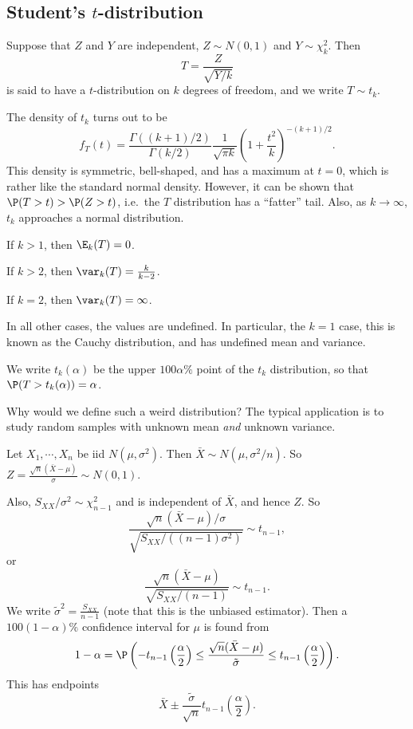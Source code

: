 \documentclass[a4paper]{article}
\begin{document}
\subsection{Student's \texorpdfstring{$t$}{t}-distribution}
\begin{defi}[$t$-distribution]
  Suppose that $Z$ and $Y$ are independent, $Z\sim N(0, 1)$ and $Y\sim \chi_k^2$. Then
  \[
    T = \frac{Z}{\sqrt{Y/k}}
  \]
  is said to have a $t$-distribution on $k$ degrees of freedom, and we write $T\sim t_k$.
\end{defi}

The density of $t_k$ turns out to be
\[
  f_T(t) = \frac{\Gamma((k + 1)/2)}{\Gamma(k/2)} \frac{1}{\sqrt{\pi k}}\left(1 + \frac{t^2}{k}\right)^{-(k+1)/2}.
\]
This density is symmetric, bell-shaped, and has a maximum at $t = 0$, which is rather like the standard normal density. However, it can be shown that $\P(T > t) > \P(Z > t)$, i.e.\ the $T$ distribution has a ``fatter'' tail. Also, as $k \to \infty$, $t_k$ approaches a normal distribution.

\begin{prop}
  If $k > 1$, then $\E_k(T) = 0$.

  If $k > 2$, then $\var_k(T) = \frac{k}{k - 2}$.

  If $k = 2$, then $\var_k(T) = \infty$.

  In all other cases, the values are undefined. In particular, the $k = 1$ case, this is known as the Cauchy distribution, and has undefined mean and variance.
\end{prop}

\begin{notation}
  We write $t_k(\alpha)$ be the upper $100\alpha\%$ point of the $t_k$ distribution, so that $\P(T > t_k(\alpha)) = \alpha$.
\end{notation}

Why would we define such a weird distribution? The typical application is to study random samples with unknown mean \emph{and} unknown variance.

Let $X_1, \cdots, X_n$ be iid $N(\mu, \sigma^2)$. Then $\bar X \sim N(\mu, \sigma^2/n)$. So $Z = \frac{\sqrt{n}(\bar X - \mu)}{\sigma} \sim N(0, 1)$.

Also, $S_{XX}/\sigma^2 \sim \chi^2_{n - 1}$ and is independent of $\bar X$, and hence $Z$. So
\[
  \frac{\sqrt{n}(\bar X - \mu)/\sigma}{\sqrt{S_{XX}/((n - 1)\sigma^2)}} \sim t_{n - 1},
\]
or
\[
  \frac{\sqrt{n}(\bar X - \mu)}{\sqrt{S_{XX}/(n - 1)}} \sim t_{n - 1}.
\]
We write $\tilde{\sigma}^2 = \frac{S_{XX}}{n - 1}$ (note that this is the unbiased estimator). Then a $100(1 - \alpha)\%$ confidence interval for $\mu$ is found from
\[
  1 - \alpha = \P\left(-t_{n - 1}\left(\frac{\alpha}{2}\right) \leq \frac{\sqrt{n}(\bar X - \mu)}{\tilde{\sigma}} \leq t_{n - 1}\left(\frac{\alpha}{2}\right)\right).
\]
This has endpoints
\[
  \bar X \pm \frac{\tilde{\sigma}}{\sqrt{n}}t_{n - 1}\left(\frac{\alpha}{2}\right).
\]
\end{document}
